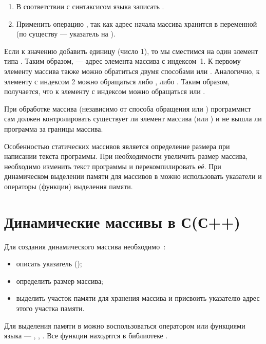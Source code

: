 \begin{enumerate}
\item В соответствии с синтаксисом языка  записать .
\item Применить операцию , так как адрес начала массива хранится в переменной  
(по существу  --- указатель на ).
\end{enumerate}

Если к значению  добавить единицу (число 1), то мы сместимся на один элемент типа .
Таким образом,  --- адрес элемента массива  с индексом~1. К
первому элементу массива  также можно обратиться двумя способами  или
. Аналогично, к элементу с индексом 2 можно обращаться либо , либо
. Таким образом, получается, что к элементу с индексом  можно обращаться
 или . 

При обработке массива (независимо от способа обращения  или )
программист сам должен контролировать существует ли элемент массива  (или
) и не вышла ли программа за границы массива.

Особенностью статических массивов является определение размера при написании текста программы. При
необходимости увеличить размер массива, необходимо изменить текст программы и перекомпилировать её. 
При динамическом
выделении памяти для массивов в  можно использовать указатели и операторы (функции) выделения памяти.

\section[Динамические массивы в С(С++)]{Динамические массивы в С(С++)}
Для создания динамического массива необходимо~\cite{VC++,Shim}:%

\begin{itemize}
\item описать указатель ();
\item определить размер массива;
\item выделить участок памяти для хранения массива и присвоить указателю адрес этого участка памяти.
\end{itemize}
Для выделения памяти в  можно воспользоваться оператором  или функциями языка  ---
, , . Все функции находятся в библиотеке
.

